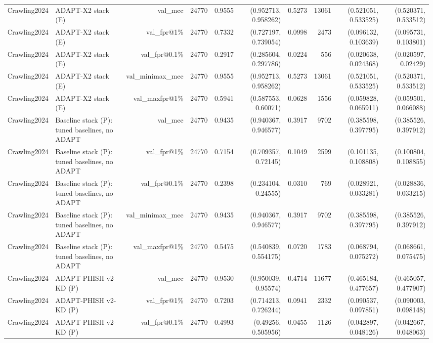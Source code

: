 \begin{table}[t]
\begin{tabular}{llrrrrrrrr}
Crawling2024 & ADAPT-X2 stack (E) & val\_mcc & 24770 & 0.9555 & (0.952713, 0.958262) & 0.5273 & 13061 & (0.521051, 0.533525) & (0.520371, 0.533512) \\
Crawling2024 & ADAPT-X2 stack (E) & val\_fpr@1\% & 24770 & 0.7332 & (0.727197, 0.739054) & 0.0998 & 2473 & (0.096132, 0.103639) & (0.095731, 0.103801) \\
Crawling2024 & ADAPT-X2 stack (E) & val\_fpr@0.1\% & 24770 & 0.2917 & (0.285604, 0.297786) & 0.0224 & 556 & (0.020638, 0.024368) & (0.020597, 0.02429) \\
Crawling2024 & ADAPT-X2 stack (E) & val\_minimax\_mcc & 24770 & 0.9555 & (0.952713, 0.958262) & 0.5273 & 13061 & (0.521051, 0.533525) & (0.520371, 0.533512) \\
Crawling2024 & ADAPT-X2 stack (E) & val\_maxfpr@1\% & 24770 & 0.5941 & (0.587553, 0.60071) & 0.0628 & 1556 & (0.059828, 0.065911) & (0.059501, 0.066088) \\
Crawling2024 & Baseline stack (P): tuned baselines, no ADAPT & val\_mcc & 24770 & 0.9435 & (0.940367, 0.946577) & 0.3917 & 9702 & (0.385598, 0.397795) & (0.385526, 0.397912) \\
Crawling2024 & Baseline stack (P): tuned baselines, no ADAPT & val\_fpr@1\% & 24770 & 0.7154 & (0.709357, 0.72145) & 0.1049 & 2599 & (0.101135, 0.108808) & (0.100804, 0.108855) \\
Crawling2024 & Baseline stack (P): tuned baselines, no ADAPT & val\_fpr@0.1\% & 24770 & 0.2398 & (0.234104, 0.24555) & 0.0310 & 769 & (0.028921, 0.033281) & (0.028836, 0.033215) \\
Crawling2024 & Baseline stack (P): tuned baselines, no ADAPT & val\_minimax\_mcc & 24770 & 0.9435 & (0.940367, 0.946577) & 0.3917 & 9702 & (0.385598, 0.397795) & (0.385526, 0.397912) \\
Crawling2024 & Baseline stack (P): tuned baselines, no ADAPT & val\_maxfpr@1\% & 24770 & 0.5475 & (0.540839, 0.554175) & 0.0720 & 1783 & (0.068794, 0.075272) & (0.068661, 0.075475) \\
Crawling2024 & ADAPT-PHISH v2-KD (P) & val\_mcc & 24770 & 0.9530 & (0.950039, 0.95574) & 0.4714 & 11677 & (0.465184, 0.477657) & (0.465057, 0.477907) \\
Crawling2024 & ADAPT-PHISH v2-KD (P) & val\_fpr@1\% & 24770 & 0.7203 & (0.714213, 0.726244) & 0.0941 & 2332 & (0.090537, 0.097851) & (0.090003, 0.098148) \\
Crawling2024 & ADAPT-PHISH v2-KD (P) & val\_fpr@0.1\% & 24770 & 0.4993 & (0.49256, 0.505956) & 0.0455 & 1126 & (0.042897, 0.048126) & (0.042667, 0.048063) \\

\end{tabular}
\end{table}
